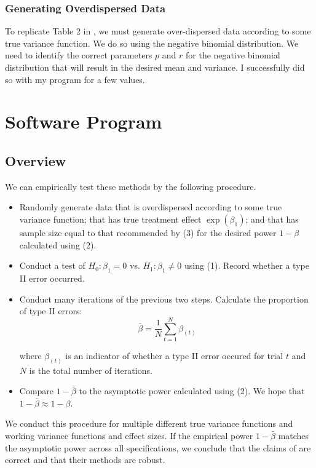 \documentclass{article}
\begin{document}
\subsubsection{Generating Overdispersed Data}

To replicate Table 2 in \cite{igeta2018}, we must generate over-dispersed data
according to some true variance function. We do so using the negative binomial
distribution. We need to identify the correct parameters $p$ and $r$ for the negative
binomial distribution that will result in the desired mean and variance. I
successfully did so with my program for a few values.

\section{Software Program}

\subsection{Overview}

We can empirically test these methods by the following procedure.

\begin{itemize}
	\item Randomly generate data that is overdispersed according to some
		true variance function; that has true treatment
		effect $\exp{(\beta_1)}$; and that has sample size equal to that
		recommended by (3) for the desired power $1-\beta$ calculated
		using (2).
	\item Conduct a test of $H_0: \beta_1 = 0$ vs. $H_1: \beta_1 \neq 0$
		using (1). Record whether a type II error occurred.
	\item Conduct many iterations of the previous two steps.
		Calculate the proportion of type II errors:
		$$
		\bar{\beta} = \frac{1}{N}\sum_{t = 1}^N \beta_{(t)}
		$$

		where $\beta_{(t)}$ is an indicator of whether a type II error
		occured for trial $t$ and $N$ is the total number of iterations.
	\item Compare $1-\bar{\beta}$ to the asymptotic power calculated using (2). We
		hope that $1-\bar{\beta} \approx 1 - \beta$.
\end{itemize}

We conduct this procedure for multiple different true variance functions and
working variance functions and effect sizes. If the empirical power $1 - \bar{\beta}$ 
matches the asymptotic power across all specifications, we conclude that the claims of
\cite{igeta2018} are correct and that their methods are robust.
\end{document}
